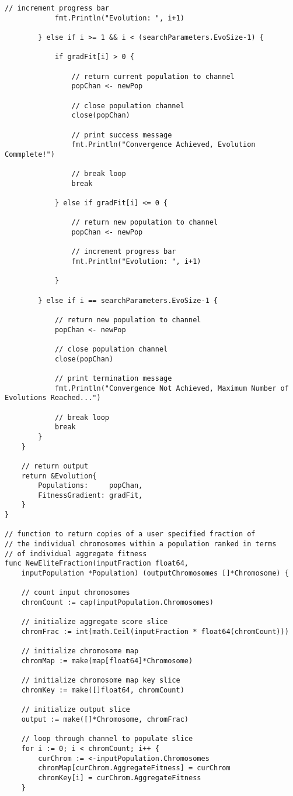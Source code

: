\begin{lstlisting}[basicstyle=\tiny]
			// increment progress bar
			fmt.Println("Evolution: ", i+1)

		} else if i >= 1 && i < (searchParameters.EvoSize-1) {

			if gradFit[i] > 0 {

				// return current population to channel
				popChan <- newPop

				// close population channel
				close(popChan)

				// print success message
				fmt.Println("Convergence Achieved, Evolution Commplete!")

				// break loop
				break

			} else if gradFit[i] <= 0 {

				// return new population to channel
				popChan <- newPop

				// increment progress bar
				fmt.Println("Evolution: ", i+1)

			}

		} else if i == searchParameters.EvoSize-1 {

			// return new population to channel
			popChan <- newPop

			// close population channel
			close(popChan)

			// print termination message
			fmt.Println("Convergence Not Achieved, Maximum Number of Evolutions Reached...")

			// break loop
			break
		}
	}

	// return output
	return &Evolution{
		Populations:     popChan,
		FitnessGradient: gradFit,
	}
}

// function to return copies of a user specified fraction of
// the individual chromosomes within a population ranked in terms
// of individual aggregate fitness
func NewEliteFraction(inputFraction float64, 
    inputPopulation *Population) (outputChromosomes []*Chromosome) {

	// count input chromosomes
	chromCount := cap(inputPopulation.Chromosomes)

	// initialize aggregate score slice
	chromFrac := int(math.Ceil(inputFraction * float64(chromCount)))

	// initialize chromosome map
	chromMap := make(map[float64]*Chromosome)

	// initialize chromosome map key slice
	chromKey := make([]float64, chromCount)

	// initialize output slice
	output := make([]*Chromosome, chromFrac)

	// loop through channel to populate slice
	for i := 0; i < chromCount; i++ {
		curChrom := <-inputPopulation.Chromosomes
		chromMap[curChrom.AggregateFitness] = curChrom
		chromKey[i] = curChrom.AggregateFitness
	}


\end{lstlisting}
